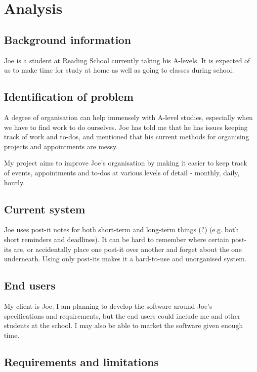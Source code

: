 \section{Analysis}

\subsection{Background information}

Joe is a student at Reading School currently taking his A-levels. It is
expected of us to make time for study at home as well as going to
classes during school.


\subsection{Identification of problem}

A degree of organisation can help immensely with A-level studies,
especially when we have to find work to do ourselves. Joe has told me
that he has issues keeping track of work and to-dos, and mentioned that
his current methods for organising projects and appointments are messy.

My project aims to improve Joe's organisation by making it easier to
keep track of events, appointments and to-dos at various levels of
detail - monthly, daily, hourly.


\subsection{Current system}

Joe uses post-it notes for both short-term and long-term things (?)
(e.g. both short reminders and deadlines). It can be hard to remember
where certain post-its are, or accidentally place one post-it over
another and forget about the one underneath. Using only post-its makes
it a hard-to-use and unorganised system.


\subsection{End users}

My client is Joe. I am planning to develop the software around Joe's
specifications and requirements, but the end users could include me and
other students at the school. I may also be able to market the software
given enough time.


\subsection{Requirements and limitations}


